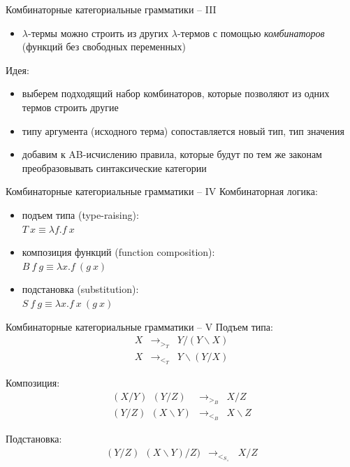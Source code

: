 \documentclass{beamer}
\begin{document}
\begin{frame}{Комбинаторные категориальные грамматики -- III}
  
  \begin{itemize}
    \item $\lambda$-термы можно строить из других $\lambda$-термов с помощью
        \textit{комбинаторов} (функций без свободных переменных)
  \end{itemize}
  
  Идея:\\
  \medskip
  \begin{itemize}
    \item выберем подходящий набор комбинаторов, которые позволяют 
          из одних термов строить другие
    \item типу аргумента (исходного терма) сопоставляется новый тип,
          тип значения
    \item добавим к AB-исчислению правила, которые будут по тем же
          законам преобразовывать синтаксические категории
  \end{itemize}
\end{frame}  

\begin{frame}{Комбинаторные категориальные грамматики -- IV}
Комбинаторная логика:\\
\medskip
  \begin{itemize}
    \item подъем типа (type-raising):\\
         $T~x \equiv \lambda f.f~x$
    \item композиция функций (function composition):\\
         $B~f~g \equiv \lambda x.f~(g~x)$
    \item подстановка (substitution):\\
         $S~f~g \equiv \lambda x.f~x~(g~x)$
  \end{itemize}
\end{frame}

\begin{frame}{Комбинаторные категориальные грамматики -- V}
Подъем типа:
\begin{eqnarray*}
X &\rightarrow_{>_T}& Y / (Y \backslash X) \\
X &\rightarrow_{<_T}& Y \backslash (Y / X) 
\end{eqnarray*}
  
Композиция:
\begin{eqnarray*}
(X / Y) ~~(Y / Z)  &\rightarrow_{>_B}& X/Z  \\
(Y / Z) ~~(X \backslash Y)  &\rightarrow_{<_B}& X \backslash Z
\end{eqnarray*}  
  
Подстановка:
  \begin{eqnarray*}
  (Y / Z)~~(X \backslash Y) / Z) &\rightarrow_{<_{S_{\times}}}& X/Z 
  \end{eqnarray*}  
\end{frame}
\end{document}
